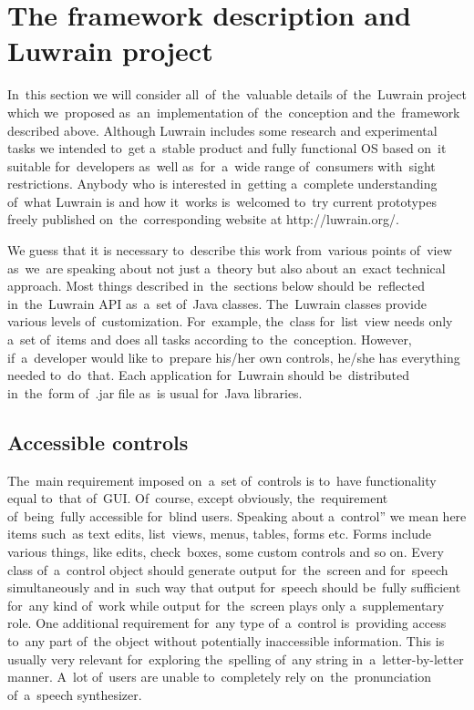 \documentclass{acm_proc_article-sp}
\begin{document}
\section{The framework description and Luwrain project}

In~this section we will consider all~of~the~valuable details  
of~the~Luwrain project which we~proposed as~an~implementation of~the~conception and the~framework described above.
Although Luwrain includes some research and experimental tasks 
we intended  to~get a~stable product and fully functional OS based on~it 
suitable for~developers as~well as~for~a~wide range of~consumers with~sight restrictions.
Anybody who is interested in~getting a~complete understanding of~what Luwrain is and how it~works 
is~welcomed to~try current prototypes freely published on~the~corresponding website at http://luwrain.org/.

We guess that it is necessary to~describe this work from~various points of~view 
as~we~are speaking about not just a~theory but also about an~exact technical approach.
Most things described in~the~sections below should be~reflected  in~the~Luwrain API
as~a~set of~Java classes.
The~Luwrain classes provide various levels of~customization.
For~example, the~class for~list~view needs only a~set of~items 
and does all tasks according to~the~conception. 
However, if~a~developer would like to~prepare his/her own controls, he/she has everything needed to~do~that.
Each application for~Luwrain should be~distributed in~the~form of~.jar file 
as~is usual for~Java libraries.

\subsection{Accessible controls}

The~main requirement imposed on~a~set of~controls 
is to~have functionality equal to~that of~GUI.
Of~course, except obviously, the~requirement of~being~fully accessible for~blind users.
Speaking about a~control'' we mean here items 
such~as text edits, list~views, menus, tables, forms etc.
Forms include various things, like edits, check~boxes, some custom controls and so on.
Every class of~a~control object should generate output for~the~screen and for~speech simultaneously and in~such way 
that output for~speech should be~fully sufficient for~any kind of~work while 
output for~the~screen plays only a~supplementary role.
One additional requirement for~any type of~a~control 
is~providing access to~any part of~the object 
without potentially  inaccessible information.
This is usually very relevant for~exploring the~spelling of~any string  in~a~letter-by-letter manner.
A~lot of~users are unable to~completely rely on~the~pronunciation of~a~speech synthesizer.
\end{document}
